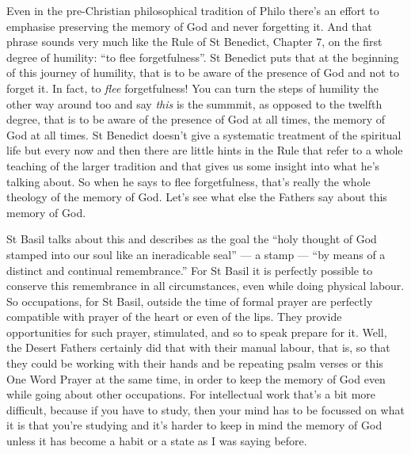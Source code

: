 Even in the pre-Christian philosophical tradition of Philo there's an effort to emphasise preserving the memory of God and never forgetting it. And that phrase sounds very much like the Rule of St Benedict, Chapter 7, on the first degree of humility: ``to flee forgetfulness''. St Benedict puts that at the beginning of this journey of humility, that is to be aware of the presence of God and not to forget it. In fact, to \emph{flee} forgetfulness! You can turn the steps of humility the other way around too and say \emph{this} is the summmit, as opposed to the twelfth degree, that is to be aware of the presence of God at all times, the memory of God at all times. St Benedict doesn't give a systematic treatment of the spiritual life but every now and then there are little hints in the Rule that refer to a whole teaching of the larger tradition and that gives us some insight into what he's talking about. So when he says to flee forgetfulness, that's really the whole theology of the memory of God. Let's see what else the Fathers say about this memory of God.

St Basil talks about this and describes as the goal the ``holy thought of God stamped into our soul like an ineradicable seal'' --- a stamp --- ``by means of a distinct and continual remembrance.'' For St Basil it is perfectly possible to conserve this remembrance in all circumstances, even while doing physical labour. So occupations, for St Basil, outside the time of formal prayer are perfectly compatible with prayer of the heart or even of the lips. They provide opportunities for such prayer, stimulated, and so to speak prepare for it. Well, the Desert Fathers certainly did that with their manual labour, that is, so that they could be working with their hands and be repeating psalm verses or this One Word Prayer at the same time, in order to keep the memory of God even while going about other occupations. For intellectual work that's a bit more difficult, because if you have to study, then your mind has to be focussed on what it is that you're studying and it's harder to keep in mind the memory of God unless it has become a habit or a state as I was saying before.

